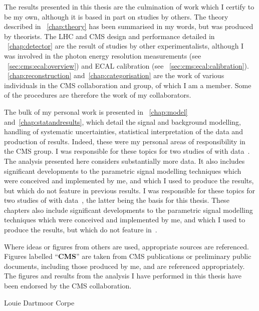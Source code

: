 \begin{declaration}
The results presented in this thesis are the culmination of work which I certify to be my own, although it is based in part on studies by others. The theory described in \Chap~\ref{chap:theory} has been summarised in my words, but was produced by theorists. The LHC and CMS design and performance detailed in \Chap~\ref{chap:detector} are the result of studies by other experimentalists, although I was involved in the \RunI photon energy resolution measurements (see \Sec~\ref{sec:cms:ecal:overview}) and \RunII ECAL calibration (see \Sec~\ref{sec:cms:ecal:calibration}).
\mbox{\Chap\s}~\ref{chap:reconstruction} and~\ref{chap:categorisation} are the work of various individuals in the CMS collaboration and \Hgg group, of which I am a member. Some of the procedures are therefore the work of my collaborators.

The bulk of my personal work is presented in \Chap\s~\ref{chap:model} and~\ref{chap:statandresults}, which detail the signal and background modelling, handling of systematic uncertainties, statistical interpretation of the data and production of results. Indeed, these were my personal areas of responsibility in the CMS \Hgg group. 
\ifNewAnalysis
I was responsible for these topics for two studies of \Hgg with \RunII data~\cite{CMS-PAS-HIG-15-005,CMS-PAS-HIG-16-020}. The analysis presented here considers substantially more data. It also includes significant developments to the parametric signal modelling techniques which were conceived and implemented by me, and which I used to produce the results, but which do not feature in previous results. 
\else
I was responsible for these topics for two studies of \Hgg with \RunII data~\cite{CMS-PAS-HIG-15-005,CMS-PAS-HIG-16-020}, the latter being the basis for this thesis. These chapters also include significant developments to the parametric signal modelling techniques which were conceived and implemented by me, and which I used to produce the results, but which do not feature in~\cite{CMS-PAS-HIG-16-020}. 
\fi

Where ideas or figures from others are used, appropriate sources are referenced. Figures labelled ``\textbf{CMS}'' are taken from CMS publications or preliminary public documents, including those produced by me, and are referenced appropriately. The figures and results from the analysis I have performed in this thesis have been endorsed by the CMS collaboration. %
 \begin{flushright}
    Louie Dartmoor Corpe
  \end{flushright}
\end{declaration}



